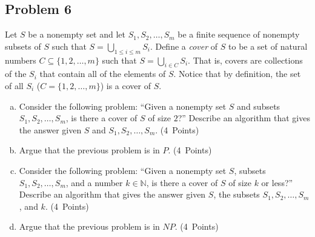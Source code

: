 \documentclass{article}
\begin{document}
\newpage
\subsection*{Problem 6}


Let $S$ be a nonempty set and let $S_1, S_2, \ldots, S_m$ be a finite sequence of nonempty subsets of $S$ such that $S = \bigcup_{1 \leq i \leq m} S_i$. Define a \emph{cover} of $S$ to be a set of natural numbers $C \subseteq \{1, 2, \ldots, m\}$ such that $S = \bigcup_{i \in C} S_i$. That is, covers are collections of the $S_i$ that contain all of the elements of $S$. Notice that by definition, the set of all $S_i$ ($C = \{1, 2, \ldots, m\}$) is a cover of $S$.

\begin{enumerate}[(a)]
    \item Consider the following problem: ``Given a nonempty set $S$ and subsets $S_1, S_2, \ldots, S_m$, is there a cover of $S$ of size $2$?'' Describe an algorithm that gives the answer given $S$ and $S_1, S_2, \ldots, S_m$. (4~Points)
    \item Argue that the previous problem is in $P$. (4~Points)
    \item Consider the following problem: ``Given a nonempty set $S$, subsets $S_1, S_2, \ldots, S_m$, and a number $k \in \mathbb{N}$, is there a cover of $S$ of size $k$ or less?'' Describe an algorithm that gives the answer given $S$, the subsets $S_1, S_2, \ldots, S_m$, and $k$. (4~Points)
    \item Argue that the previous problem is in $NP$. (4~Points)
\end{enumerate}
\end{document}
